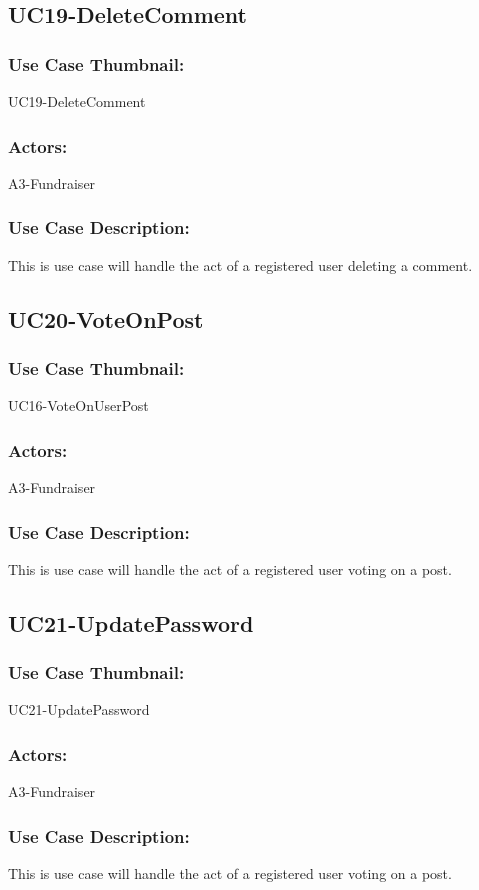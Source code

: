 \documentclass[11pt, openany]{report}
\begin{document}
\subsection{UC19-DeleteComment}
\label{sUC19}
\subsubsection*{Use Case Thumbnail:}
UC19-DeleteComment
\subsubsection*{Actors:}
A3-Fundraiser
\subsubsection*{Use Case Description:}
This is use case will handle the act of a registered user deleting a comment.


\subsection{UC20-VoteOnPost}
\label{sUC20}
\subsubsection*{Use Case Thumbnail:}
UC16-VoteOnUserPost
\subsubsection*{Actors:}
A3-Fundraiser
\subsubsection*{Use Case Description:}
This is use case will handle the act of a registered user voting on a post.

\subsection{UC21-UpdatePassword}
\label{sUC21}
\subsubsection*{Use Case Thumbnail:}
UC21-UpdatePassword
\subsubsection*{Actors:}
A3-Fundraiser
\subsubsection*{Use Case Description:}
This is use case will handle the act of a registered user voting on a post.
\end{document}
